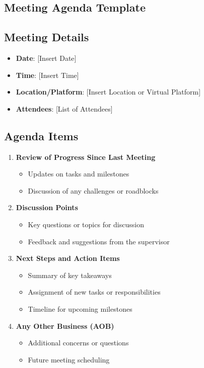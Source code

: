 \documentclass{article}
\begin{document}
\subsection{Meeting Agenda Template}

\subsection*{Meeting Details}

\begin{itemize}
    \item \textbf{Date}: [Insert Date]
    \item \textbf{Time}: [Insert Time]
    \item \textbf{Location/Platform}: [Insert Location or Virtual Platform]
    \item \textbf{Attendees}: [List of Attendees]
\end{itemize}

\subsection*{Agenda Items}

\begin{enumerate}
    \item \textbf{Review of Progress Since Last Meeting}
    \begin{itemize}
        \item Updates on tasks and milestones
        \item Discussion of any challenges or roadblocks
    \end{itemize}
    \item \textbf{Discussion Points}
    \begin{itemize}
        \item Key questions or topics for discussion
        \item Feedback and suggestions from the supervisor
    \end{itemize}
    \item \textbf{Next Steps and Action Items}
    \begin{itemize}
        \item Summary of key takeaways
        \item Assignment of new tasks or responsibilities
        \item Timeline for upcoming milestones
    \end{itemize}
    \item \textbf{Any Other Business (AOB)}
    \begin{itemize}
        \item Additional concerns or questions
        \item Future meeting scheduling
    \end{itemize}
\end{enumerate}
\end{document}
